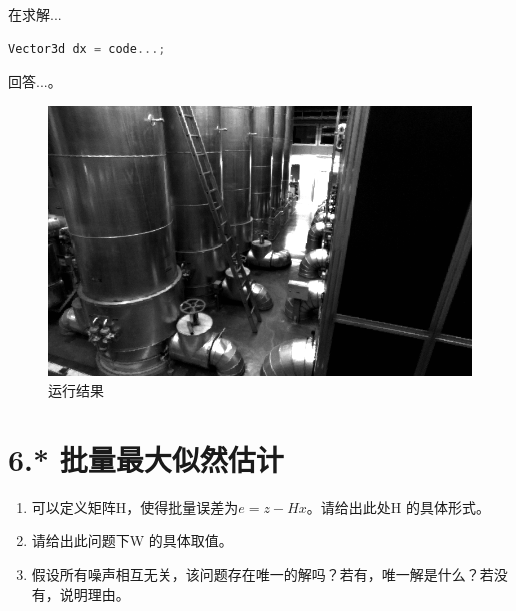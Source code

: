 \documentclass[
	12pt, %
]{fphw} %
\begin{document}
在求解...
\begin{lstlisting}[language=C++, caption=题5所添代码] 
	Vector3d dx = code...;
\end{lstlisting}
回答...。
\begin{figure}[h]
	\centering
	\includegraphics[width=0.8\columnwidth]{pic1.png} %
	\caption{运行结果}
\end{figure}

\clearpage
\section*{6.* 批量最大似然估计}

\begin{problem}

	\begin{enumerate}
		\item 可以定义矩阵H，使得批量误差为$e=z-Hx$。请给出此处H 的具体形式。
		\item 请给出此问题下W 的具体取值。
		\item 假设所有噪声相互无关，该问题存在唯一的解吗？若有，唯一解是什么？若没有，说明理由。
	\end{enumerate}

\end{problem}
\end{document}
